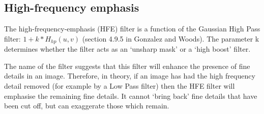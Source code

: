 \documentclass{article}
\begin{document}
\subsection*{High-frequency emphasis}
The high-frequency-emphasis (HFE) filter is a function of the Gaussian High Pass filter: $1 + k * H_{hp} (u,v)$ (section 4.9.5 in Gonzalez and Woods).
The parameter k determines whether the filter acts as an `unsharp mask' or a `high boost' filter.

The name of the filter suggests that this filter will enhance the presence of fine details in an image. Therefore, in theory, if an image has had the high frequency detail removed (for example by a Low Pass filter) then the HFE filter will emphasise the remaining fine details. It cannot `bring back' fine details that have been cut off, but can exaggerate those which remain.
\end{document}
